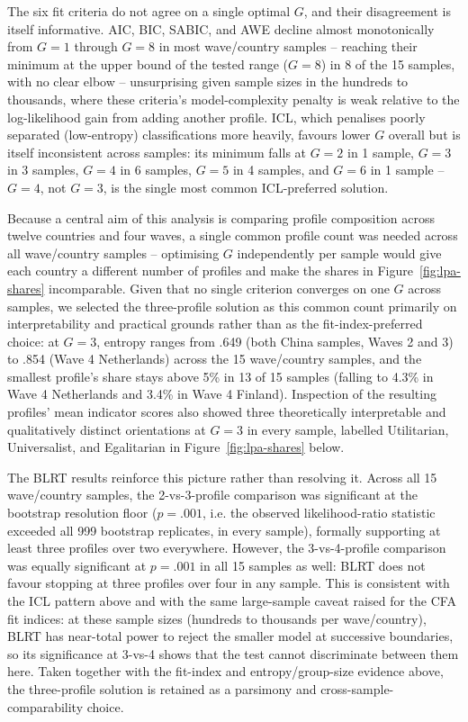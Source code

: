 \documentclass[10pt,letterpaper]{article}
\begin{document}
The six fit criteria do not agree on a single optimal $G$, and their disagreement is itself informative. AIC, BIC, SABIC, and AWE decline almost monotonically from $G=1$ through $G=8$ in most wave/country samples -- reaching their minimum at the upper bound of the tested range ($G=8$) in 8 of the 15 samples, with no clear elbow -- unsurprising given sample sizes in the hundreds to thousands, where these criteria's model-complexity penalty is weak relative to the log-likelihood gain from adding another profile. ICL, which penalises poorly separated (low-entropy) classifications more heavily, favours lower $G$ overall but is itself inconsistent across samples: its minimum falls at $G=2$ in 1 sample, $G=3$ in 3 samples, $G=4$ in 6 samples, $G=5$ in 4 samples, and $G=6$ in 1 sample -- $G=4$, not $G=3$, is the single most common ICL-preferred solution.

Because a central aim of this analysis is comparing profile composition across twelve countries and four waves, a single common profile count was needed across all wave/country samples -- optimising $G$ independently per sample would give each country a different number of profiles and make the shares in Figure~\ref{fig:lpa-shares} incomparable. Given that no single criterion converges on one $G$ across samples, we selected the three-profile solution as this common count primarily on interpretability and practical grounds rather than as the fit-index-preferred choice: at $G=3$, entropy ranges from .649 (both China samples, Waves 2 and 3) to .854 (Wave 4 Netherlands) across the 15 wave/country samples, and the smallest profile's share stays above 5\% in 13 of 15 samples (falling to 4.3\% in Wave 4 Netherlands and 3.4\% in Wave 4 Finland). Inspection of the resulting profiles' mean indicator scores also showed three theoretically interpretable and qualitatively distinct orientations at $G=3$ in every sample, labelled Utilitarian, Universalist, and Egalitarian in Figure~\ref{fig:lpa-shares} below.

The BLRT results reinforce this picture rather than resolving it. Across all 15 wave/country samples, the 2-vs-3-profile comparison was significant at the bootstrap resolution floor ($p = .001$, i.e. the observed likelihood-ratio statistic exceeded all 999 bootstrap replicates, in every sample), formally supporting at least three profiles over two everywhere. However, the 3-vs-4-profile comparison was equally significant at $p = .001$ in all 15 samples as well: BLRT does not favour stopping at three profiles over four in any sample. This is consistent with the ICL pattern above and with the same large-sample caveat raised for the CFA fit indices: at these sample sizes (hundreds to thousands per wave/country), BLRT has near-total power to reject the smaller model at successive boundaries, so its significance at 3-vs-4 shows that the test cannot discriminate between them here. Taken together with the fit-index and entropy/group-size evidence above, the three-profile solution is retained as a parsimony and cross-sample-comparability choice.
\end{document}
